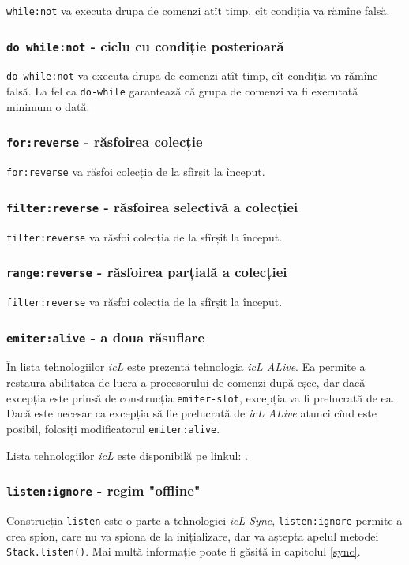 \texttt{while:not} va executa drupa de comenzi atît timp, cît condiția va rămîne falsă.

\subsubsection{\texttt{do while:not} - ciclu cu condiție posterioară}

\texttt{do-while:not} va executa drupa de comenzi atît timp, cît condiția va rămîne falsă. La fel ca \texttt{do-while} garantează că grupa de comenzi va fi executată minimum o dată.

\subsubsection{\texttt{for:reverse} - răsfoirea colecție}

\texttt{for:reverse} va răsfoi colecția de la sfîrșit la început.

\subsubsection{\texttt{filter:reverse} - răsfoirea selectivă a colecției}

\texttt{filter:reverse} va răsfoi colecția de la sfîrșit la început.

\subsubsection{\texttt{range:reverse} - răsfoirea parțială a colecției}

\texttt{filter:reverse} va răsfoi colecția de la sfîrșit la început.

\subsubsection{\texttt{emiter:alive} - a doua răsuflare}

În lista tehnologiilor \textit{icL} este prezentă tehnologia \textit{icL ALive}. Ea permite a restaura abilitatea de lucra a procesorului de comenzi după eșec, dar dacă excepția este prinsă de construcția \texttt{emiter-slot}, excepția va fi prelucrată de ea. Dacă este necesar ca excepția să fie prelucrată de \textit{icL ALive} atunci cînd este posibil, folosiți modificatorul \texttt{emiter:alive}.

Lista tehnologiilor \textit{icL} este disponibilă pe linkul: .

\subsubsection{\texttt{listen:ignore} - regim "offline"}

Construcția \texttt{listen} este o parte a tehnologiei \textit{icL-Sync}, \texttt{listen:ignore} permite a crea spion, care nu va spiona de la inițializare, dar va aștepta apelul metodei \texttt{Stack.listen()}. Mai multă informație poate fi găsită in capitolul \ref{sync}.